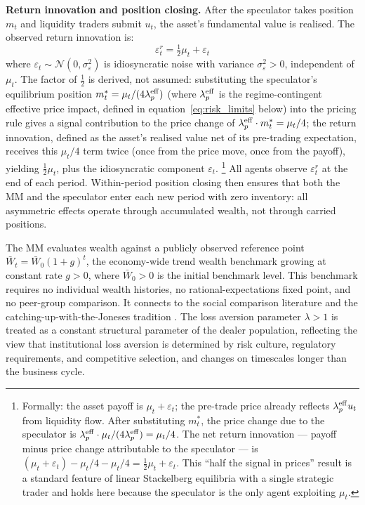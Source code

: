 \documentclass[12pt,a4paper]{article}
\theoremstyle{definition}
\begin{document}
\noindent\textbf{Return innovation and position closing.}
After the speculator takes position $m_t$ and liquidity traders submit
$u_t$, the asset's fundamental value is realised. The observed return
innovation is:
\begin{equation}
  \varepsilon^r_t = \tfrac{1}{2}\mu_t + \varepsilon_t
  \label{eq:return_innovation}
\end{equation}
where $\varepsilon_t \sim \mathcal{N}(0, \sigma^2_\varepsilon)$ is
idiosyncratic noise with variance $\sigma^2_\varepsilon > 0$,
independent of $\mu_t$. The factor of $\tfrac{1}{2}$ is derived, not
assumed: substituting the speculator's equilibrium position
$m^*_t = \mu_t/(4\lambda^{\rm eff}_p)$ (where $\lambda^{\rm eff}_p$ is
the regime-contingent effective price impact, defined in
equation~\eqref{eq:risk_limits} below) into the pricing rule gives a
signal contribution to the price change of
$\lambda^{\rm eff}_p \cdot m^*_t = \mu_t/4$; the return innovation,
defined as the asset's realised value net of its pre-trading expectation,
receives this $\mu_t/4$ term twice (once from the price move, once from
the payoff), yielding $\tfrac{1}{2}\mu_t$, plus the idiosyncratic
component $\varepsilon_t$.%
\footnote{Formally: the asset payoff is $\mu_t + \varepsilon_t$; the
pre-trade price already reflects $\lambda^{\rm eff}_p u_t$ from
liquidity flow. After substituting $m^*_t$, the price change due to the
speculator is $\lambda^{\rm eff}_p \cdot \mu_t/(4\lambda^{\rm eff}_p)
= \mu_t/4$. The net return innovation --- payoff minus price change
attributable to the speculator --- is
$(\mu_t + \varepsilon_t) - \mu_t/4 - \mu_t/4 = \tfrac{1}{2}\mu_t +
\varepsilon_t$. This ``half the signal in prices'' result is a standard
feature of linear Stackelberg equilibria with a single strategic trader
\citep{kyle1985} and holds here because the speculator is the only
agent exploiting $\mu_t$.}
All agents observe $\varepsilon^r_t$ at the end of each
period. Within-period position closing then ensures that both the MM
and the speculator enter each new period with zero inventory: all
asymmetric effects operate through accumulated wealth, not through
carried positions.

The MM evaluates wealth against a publicly observed reference point
$\bar{W}_t = \bar{W}_0(1+g)^t$, the economy-wide trend wealth benchmark
growing at constant rate $g > 0$, where $\bar{W}_0 > 0$ is the initial
benchmark level. This benchmark requires no individual wealth histories,
no rational-expectations fixed point, and no peer-group comparison. It
connects to the social comparison literature \citep{festinger1954} and
the catching-up-with-the-Joneses tradition \citep{abel1990,campbell1999}.
The loss aversion parameter $\lambda > 1$ is treated as a constant
structural parameter of the dealer population, reflecting the view that
institutional loss aversion is determined by risk culture, regulatory
requirements, and competitive selection, and changes on timescales
longer than the business cycle.
\end{document}
